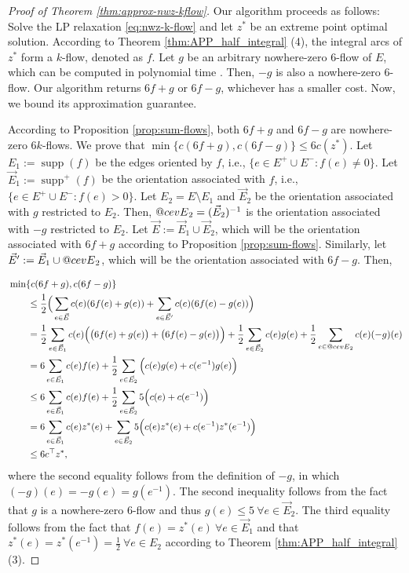 \documentclass[11pt]{article}
\makeatletter
\DeclareRobustCommand{\cev}[1]{{\mathpalette\do@cev{#1}}}
\newcommand{\do@cev}[2]{\vbox{\offinterlineskip
    \sbox\z@{$\m@th#1 x$}\ialign{##\cr
      \hidewidth\reflectbox{$\m@th#1\vec{}\mkern4mu$}\hidewidth\cr
      \noalign{\kern-\ht\z@}
      $\m@th#1#2$\cr
    }}}
\DeclareMathOperator{\supp}{supp}
\makeatother
\begin{document}
\begin{proof}[Proof of Theorem \ref{thm:approx-nwz-kflow}]
Our algorithm proceeds as follows: Solve the LP relaxation \eqref{eq:nwz-k-flow} and let $z^*$ be an extreme point optimal solution. According to Theorem \ref{thm:APP_half_integral} (4), the integral arcs of $z^*$ form a $k$-flow, denoted as $f$. Let $g$ be an arbitrary nowhere-zero $6$-flow of $E$, which can be computed in polynomial time \cite{younger1983integer}. Then, $-g$ is also a nowhere-zero $6$-flow. Our algorithm returns $6f+g$ or $6f-g$, whichever has a smaller cost. Now, we bound its approximation guarantee. 

    According to Proposition \ref{prop:sum-flows}, both $6f+g$ and $6f-g$ are nowhere-zero $6k$-flows. We prove that $\min\{c(6f+g),c(6f-g)\}\leq 6 c(z^*)$. Let $E_1:=\supp(f)$ be the edges oriented by $f$, i.e., $\{e\in E^+\cup E^-: f(e)\neq 0\}$. Let $\vec{E}_1:=\supp^+(f)$ be the orientation associated with $f$, i.e., $\{e\in E^+\cup E^-: f(e)>0\}$. Let $E_2=E\setminus E_1$ and $\vec{E}_2$ be the orientation associated with $g$ restricted to $E_2$. Then, $\cev{E}_2=(\vec{E}_2)^{-1}$ is the orientation associated with $-g$ restricted to $E_2$. Let $\vec{E}:=\vec{E}_1\cup \vec{E}_2$, which will be the orientation associated with $6f+g$ according to Proposition \ref{prop:sum-flows}. Similarly, let $\vec{E}':=\vec{E}_1\cup \cev{E}_2$, which will be the orientation associated with $6f-g$. Then,
    
\[
\begin{aligned}
    &\min\{c(6f+g),c(6f-g)\}\\
    &\quad \quad \leq \frac{1}{2}\Big(\sum_{e\in \vec{E}} c(e)(6f(e)+g(e))+\sum_{e\in \vec{E}'} c(e)(6f(e)-g(e))\Big)\\
    &\quad \quad =\frac{1}{2}\sum_{e\in \vec{E}_1} c(e)\Big(\big(6f(e)+g(e)\big)+\big(6f(e)-g(e)\big)\Big)+\frac{1}{2}\sum_{e\in \vec{E}_2} c(e)g(e)+\frac{1}{2}\sum_{e\in \cev{E}_2} c(e)(-g)(e)\\
    &\quad \quad =6\sum_{e\in \vec{E}_1} c(e)f(e)+\frac{1}{2}\sum_{e\in \vec{E}_2} \Big(c(e)g(e)+c(e^{-1})g(e)\Big)\\
    &\quad \quad \leq 6\sum_{e\in \vec{E}_1} c(e)f(e)+\frac{1}{2}\sum_{e\in \vec{E}_2} 5\Big(c(e)+c(e^{-1})\Big)\\
    &\quad \quad =6\sum_{e\in \vec{E}_1} c(e)z^*(e)+\sum_{e\in \vec{E}_2} 5\Big(c(e)z^*(e)+c(e^{-1})z^*(e^{-1})\Big)\\
    &\quad \quad \leq 6c^\top z^*,
\end{aligned}
\]
where the second equality follows from the definition of $-g$, in which $(-g)(e)=-g(e)=g(e^{-1})$. The second inequality follows from the fact that $g$ is a nowhere-zero $6$-flow and thus $g(e)\leq 5\ \forall e\in \vec{E}_2$. The third equality follows from the fact that $f(e)=z^*(e)\ \forall e\in \vec{E}_1$ and that $z^*(e)=z^*(e^{-1})=\frac{1}{2}\ \forall e\in E_2$ according to Theorem \ref{thm:APP_half_integral} (3). 
    
\end{proof}
\end{document}
